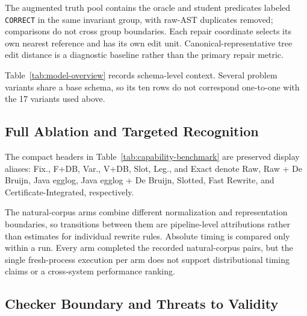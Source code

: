 



The augmented truth pool contains the oracle and student predicates labeled
\texttt{CORRECT} in the same invariant group, with raw-AST duplicates removed;
comparisons do not cross group boundaries. Each repair coordinate selects its
own nearest reference and has
its own edit unit.  Canonical-representative tree edit distance is a diagnostic
baseline rather than the primary repair metric.

Table~\ref{tab:model-overview} records schema-level context.  Several problem
variants share a base schema, so its ten rows do not correspond one-to-one
with the 17 variants used above.

\begin{table}[H]
\centering
\caption{Base-model size context.  Sig./Abs./Ext./Rel. denote signatures,
abstract signatures, extensions, and relations.}
\label{tab:model-overview}
\scriptsize
\setlength{\tabcolsep}{2.5pt}

\end{table}

\subsection{Full Ablation and Targeted Recognition}




The compact headers in Table~\ref{tab:capability-benchmark} are preserved
display aliases: Fix., F+DB, Var., V+DB, Slot, Leg., and Exact denote Raw,
Raw + De Bruijn, Java egglog, Java egglog + De Bruijn, Slotted, Fast Rewrite,
and Certificate-Integrated, respectively.

The natural-corpus arms combine different normalization and representation
boundaries, so transitions between them are pipeline-level attributions rather
than estimates for individual rewrite rules.  Absolute timing is compared only
within a run.  Every arm completed the recorded natural-corpus pairs, but the
single fresh-process execution per arm does not support distributional timing
claims or a cross-system performance ranking.

\subsection{Checker Boundary and Threats to Validity}

